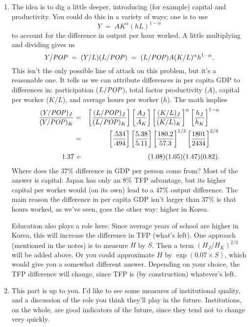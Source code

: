 \documentclass[letterpaper,12pt]{article}
\newcommand{\POP}{\mbox{\it POP\/}}
\begin{document}
\begin{enumerate}
\begin{enumerate}
\item The idea is to dig a little deeper, 
introducing (for example) capital and productivity.  
You could do this in a variety of ways; 
one is to use 
\[
    Y \;=\; A K^\alpha (h L)^{1-\alpha} 
\]
to account for the difference in output per hour worked.  
A little multiplying and dividing gives us 
\[
    Y/\POP \;=\; (Y/L) (L/\POP) \;=\; (L/\POP) A (K/L)^\alpha h^{1-\alpha} .
\]
This isn't the only possible line of attack on this problem, but
it's a reasonable one.  It tells us we can attribute differences
in per capita GDP to differences in:  participation ($L/\POP$),
total factor productivity ($A$), capital per worker ($K/L$), 
and average hours per worker ($h$). 
The math implies
%
\begin{eqnarray*}
    \frac{(Y/\POP)_{J}}{(Y/\POP)_{K}} &=&
             \left[ \frac{(L/\POP)_J}{(L/\POP)_{K}} \right]
             \left[ \frac{A_J}{A_{K}} \right]
             \left[ \frac{(K/L)_{J}}{(K/L)_{K}} \right]^\alpha
             \left[ \frac{h_{J}}{h_{K}} \right]^{1-\alpha} \\
             &=& \left[ \frac{.534}{.494} \right]
                 \left[ \frac{5.38}{5.11} \right]
                 \left[ \frac{180.2}{57.3} \right]^{1/3}
                 \left[ \frac{1801}{2434} \right]^{2/3}_{\phantom{\sum_i}} \\
      1.37   &=& (1.08)(1.05) (1.47) (0.82) .
\end{eqnarray*}
%
Where does the 37\% difference in GDP per person come from?
Most of the answer is capital: 
Japan has only an 8\% TFP advantage, 
but its higher capital per worker would (on its own) 
lead to a 47\% output difference.  
The main reason the difference in per capita GDP isn't larger than 37\% is that hours worked, as we've seen, goes the other way:  
higher in Korea.  

Education also plays a role here.  
Since average years of school are higher in Korea, this will increase the difference
in TFP (what's left).  
One approach (mentioned in the notes) is to measure $H$ by $S$.  Then a 
term $(H_J/H_K)^{2/3}$ will be added above.  
Or you could approximate $H$ by $ \exp(0.07 \times S)$, which would give 
you a somewhat different answer.  
Depending on your choice, the TFP difference will change, 
since TFP is (by construction) whatever's left.  


\item This part is up to you.  
I'd like to see some measures of institutional quality, 
and a discussion of the role you think they'll play in 
the future.
Institutions, on the whole, are good indicators of the future, 
since they tend not to change very quickly.  



\end{enumerate}
\end{enumerate}
\end{document}
